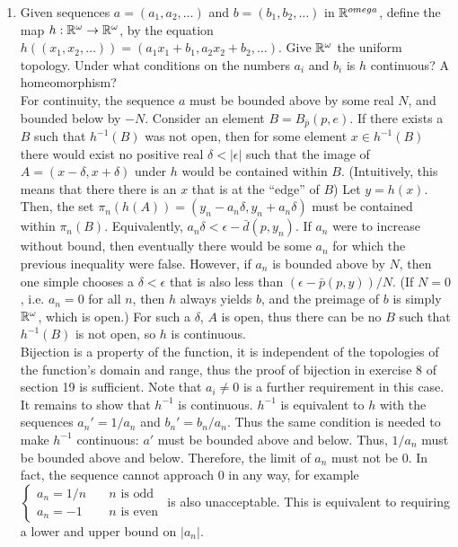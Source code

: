 \documentclass[12pt,letterpaper]{article}
\begin{document}
\begin{enumerate}
\begin{enumerate}
  \end{enumerate}
  \item Given sequences $a=(a_1,a_2,\dots)$ and $b=(b_1,b_2,\dots)$ in $\mathbb{R}^{omega}$, define the map $h: \mathbb{R}^{\omega} \rightarrow \mathbb{R}^{\omega}$, by the equation $h((x_1,x_2,\dots)) = (a_1x_1+b_1,a_2x_2+b_2,\dots)$. Give $\mathbb{R}^{\omega}$ the uniform topology. Under what conditions on the numbers $a_i$ and $b_i$ is $h$ continuous? A homeomorphism? \\
  For continuity, the sequence $a$ must be bounded above by some real $N$, and bounded below by $-N$. Consider an element $B=B_{\bar{p}}(p,e)$. If there exists a $B$ such that $h^{-1}(B)$ was not open, then for some element $x\in h^{-1}(B)$ there would exist no positive real $\delta<|\epsilon|$ such that the image of $A=(x-\delta, x+\delta)$ under $h$ would be contained within $B$. (Intuitively, this means that there there is an $x$ that is at the ``edge'' of $B$) Let $y=h(x)$. Then, the set $\pi_n(h(A)) = (y_n - a_n\delta, y_n+a_n\delta)$ must be contained within $\pi_n(B)$. Equivalently, $a_n\delta < \epsilon - \bar{d}(p,y_n)$. If $a_n$ were to increase without bound, then eventually there would be some $a_n$ for which the previous inequality were false. However, if $a_n$ is bounded above by $N$, then one simple chooses a $\delta<\epsilon$ that is also less than $(\epsilon-\bar{p}(p,y))/N$. (If $N=0$, i.e. $a_n=0$ for all $n$, then $h$ always yields $b$, and the preimage of $b$ is simply $\mathbb{R}^\omega$, which is open.) For such a $\delta$, $A$ is open, thus there can be no $B$ such that $h^{-1}(B)$ is not open, so $h$ is continuous.\\
  Bijection is a property of the function, it is independent of the topologies of the function's domain and range, thus the proof of bijection in exercise 8 of section 19 is sufficient. Note that $a_i\neq 0$ is a further requirement in this case. It remains to show that $h^{-1}$ is continuous. $h^{-1}$ is equivalent to $h$ with the sequences $a_n' = 1/a_n$ and $b_n' = b_n/a_n$. Thus the same condition is needed to make $h^{-1}$ continuous: $a'$ must be bounded above and below. Thus, $1/a_n$ must be bounded above and below. Therefore, the limit of $a_n$ must not be $0$. In fact, the sequence cannot approach $0$ in any way, for example $\begin{cases} a_n=1/n \quad & n \text{ is odd} \\ a_n = -1 \quad & n \text{ is even}\end{cases}$ is also unacceptable. This is equivalent to requiring a lower and upper bound on $|a_n|$.

\end{enumerate}
\end{document}
